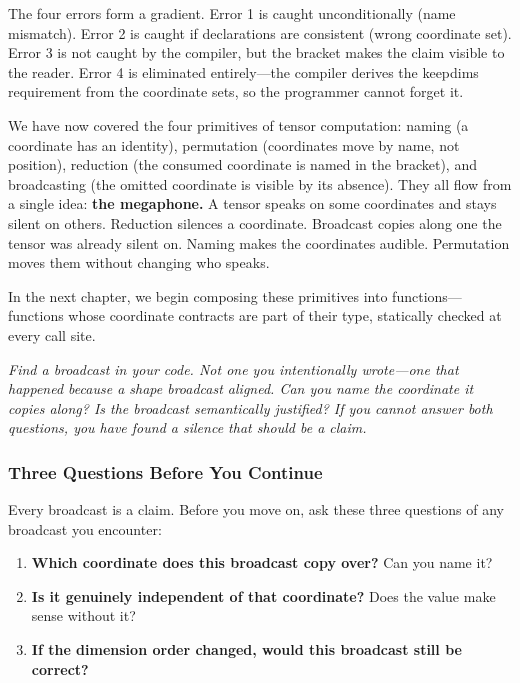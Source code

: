 \documentclass[11pt,titlepage]{article}
\providecommand{\tightlist}{%
  \setlength{\itemsep}{0pt}\setlength{\parskip}{0pt}}
\begin{document}
The four errors form a gradient. Error 1 is caught unconditionally (name
mismatch). Error 2 is caught if declarations are consistent (wrong
coordinate set). Error 3 is not caught by the compiler, but the bracket
makes the claim visible to the reader. Error 4 is eliminated
entirely---the compiler derives the keepdims requirement from the
coordinate sets, so the programmer cannot forget it.

\vspace{2em}

We have now covered the four primitives of tensor computation: naming (a
coordinate has an identity), permutation (coordinates move by name, not
position), reduction (the consumed coordinate is named in the bracket),
and broadcasting (the omitted coordinate is visible by its absence).
They all flow from a single idea: \textbf{the megaphone.} A tensor
speaks on some coordinates and stays silent on others. Reduction
silences a coordinate. Broadcast copies along one the tensor was already
silent on. Naming makes the coordinates audible. Permutation moves them
without changing who speaks.

In the next chapter, we begin composing these primitives into
functions---functions whose coordinate contracts are part of their type,
statically checked at every call site.

\vspace{2em}

\emph{Find a broadcast in your code. Not one you intentionally
wrote---one that happened because a shape broadcast aligned. Can you
name the coordinate it copies along? Is the broadcast semantically
justified? If you cannot answer both questions, you have found a silence
that should be a claim.}

\vspace{2em}

\hypertarget{three-questions-before-you-continue}{%
\subsubsection{Three Questions Before You
Continue}\label{three-questions-before-you-continue}}

Every broadcast is a claim. Before you move on, ask these three
questions of any broadcast you encounter:

\begin{enumerate}
\def\labelenumi{\arabic{enumi}.}
\tightlist
\item
  \textbf{Which coordinate does this broadcast copy over?} Can you name
  it?
\item
  \textbf{Is it genuinely independent of that coordinate?} Does the
  value make sense without it?
\item
  \textbf{If the dimension order changed, would this broadcast still be
  correct?}
\end{enumerate}
\end{document}
